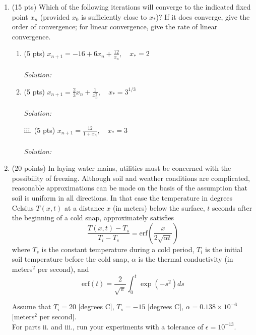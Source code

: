 \documentclass{article}
\begin{document}
	
	\begin{enumerate}
		\item (15 pts) Which of the following iterations will converge to the indicated fixed point $x_n$ (provided $x_0$ is sufficiently close to $x_*$)? If it does converge, give the order of convergence;
		for linear convergence, give the rate of linear convergence.
		\begin{enumerate}[label=\roman*]
			\item (5 pts) $x_{n+1} = -16 + 6x_n + \frac{12}{x_n}, \quad x_* = 2$\\
			\\
			\textit{Solution:} \\
			
			
			\item (5 pts) $x_{n+1} = \frac{2}{3}x_n + \frac{1}{x^2_n}, \quad x_* = 3^{1/3}$\\
			\\
			\textit{Solution:}\\
			
			
			\item[iii.] (5 pts) $x_{n+1} = \frac{12}{1+x_n}, \quad x_* = 3$\\
			\\
			\textit{Solution:}\\
			
			
		\end{enumerate}
		
		\item (20 points) In laying water mains, utilities must be concerned with the possibility of freezing. Although soil and weather conditions are complicated, reasonable approximations can be made on the basis of the assumption that soil is uniform in all directions. In that case the temperature in degrees Celsius $T(x, t)$ at a distance $x$ (in meters) below the surface, $t$ seconds after the beginning of a cold snap, approximately satisfies
		\[\frac{T(x,t)-T_s}{T_i-T_s}=\text{erf}\left(\frac{x}{2\sqrt{\alpha t}}\right)\]
		where $T_s$ is the constant temperature during a cold period, $T_i$ is the initial soil temperature before the cold snap, $\alpha$ is the thermal conductivity (in meters$^2$ per second), and
		\[\text{erf}(t) = \frac{2}{\sqrt{\pi}} \int^t_0\exp(-s^2)ds\]
		
		Assume that $T_i = 20$ [degrees C], $T_s = -15$ [degrees C], $\alpha = 0.138 \times 10^{-6}$ [meters$^2$ per second].\\
		
		For parts ii. and iii., run your experiments with a tolerance of $\epsilon = 10^{-13}$.
		

\end{enumerate}
\end{document}
